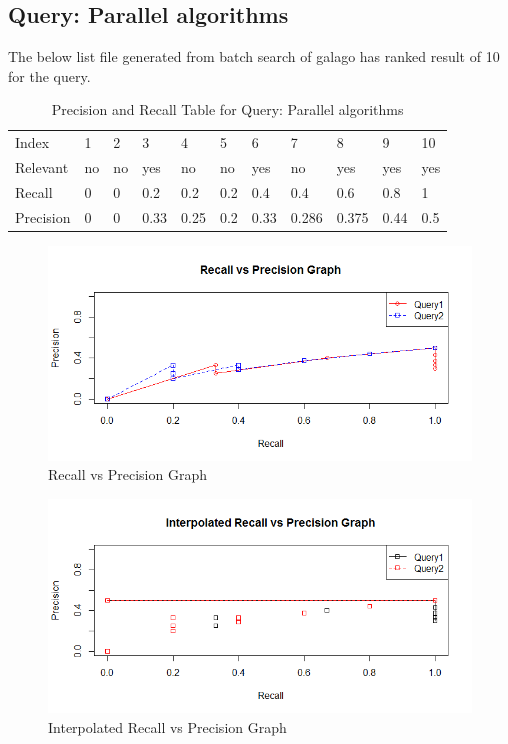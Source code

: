 \documentclass[12pt]{report}
\begin{document}
\subsection{Query: Parallel algorithms}

The below list file generated from batch search of galago has ranked result of 10 for the query.


\begin{table}[]
\centering
\caption{Precision and Recall Table for Query: Parallel algorithms }
\label{my-label}
\begin{tabular}{lllllllllll}
Index     & 1   & 2     & 3     & 4     & 5     & 6     & 7     & 8     & 9    & 10  \\
Relevant  & no  & no   & yes   & no   & no   & yes   & no    & yes   & yes  & yes  \\
Recall    & 0 & 0 & 0.2 & 0.2 & 0.2 & 0.4 & 0.4 & 0.6 & 0.8    & 1   \\
Precision & 0 & 0   & 0.33  & 0.25  & 0.2   & 0.33 & 0.286 & 0.375  & 0.44 & 0.5
\end{tabular}
\end{table}

\begin{figure}[ht]
  \centering
  \includegraphics[width=1\textwidth]{Problem8_4/RecallvsPrecision.png}
  \caption{Recall vs Precision Graph}
  \label{fig:1}
\end{figure} 

\begin{figure}[ht]
  \centering
  \includegraphics[width=1\textwidth]{Problem8_4/InterpolatedRecallvsPrecision.png}
  \caption{Interpolated Recall vs Precision Graph}
  \label{fig:1}
\end{figure}
\end{document}
